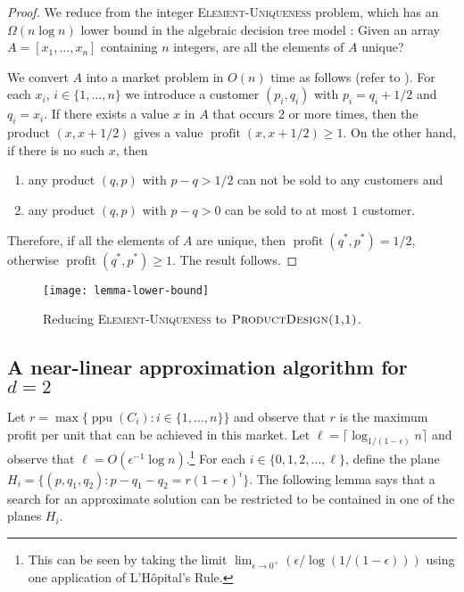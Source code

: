 \documentclass[lotsofwhite]{patmorin}
\newcommand{\ppu}{\operatorname{ppu}}
\newcommand{\val}{\operatorname{profit}}
\newcommand{\eps}{\epsilon}
\begin{document}
\begin{proof}
  We reduce from the integer \textsc{Element-Uniqueness} problem, which
  has an $\Omega(n\log n)$ lower bound in the algebraic decision tree
  model \cite{boYY,yXX}: Given an array $A=[x_1,\ldots,x_n]$ containing
  $n$ integers, are all the elements of $A$ unique?

  We convert $A$ into a market problem in $O(n)$ time as follows (refer
  to ).  For each $x_i$, $i\in\{1,\ldots,n\}$
  we introduce a customer $(p_i,q_i)$ with $p_i=q_i+1/2$ and $q_i=x_i$.
  If there exists a value $x$ in $A$ that occurs $2$ or more times, then
  the product $(x,x+1/2)$ gives a value $\val(x,x+1/2) \ge 1$.  On the
  other hand, if there is no such $x$, then \begin{enumerate} \item
  any product $(q,p)$ with $p-q>1/2$ can not be sold to any customers
  and \item any product $(q,p)$ with $p-q>0$ can be sold to at most $1$
  customer.  \end{enumerate} Therefore, if all the elements of $A$ are
  unique, then $\val(q^*,p^*) = 1/2$, otherwise $\val(q^*,p^*) \ge 1$.
  The result follows.
\end{proof}

\begin{figure}
  \begin{center}
    \texttt{[image: lemma-lower-bound]}
  \end{center}
  \caption{Reducing \textsc{Element-Uniqueness} to
           $\textsc{ProductDesign(1,1)}$.}
\end{figure}

\subsection{A near-linear approximation algorithm for $d=2$}

Let $r=\max\{\ppu(C_i) : i\in\{1,\ldots, n\}\}$ and observe that $r$
is the maximum profit per unit that can be achieved in this market.
Let $\ell = \lceil\log_{1/(1-\eps)} n\rceil$ and observe that $\ell =
O(\eps^{-1}\log n)$.\footnote{This can be seen by taking the limit
$\lim_{\eps\rightarrow 0^+} (\eps/\log(1/(1-\eps)))$ using one
application of L'H\^opital's Rule.} For each $i\in\{0,1,2,\ldots,\ell\}$,
define the plane $H_i = \{ (p,q_1,q_2) : p-q_1-q_2 = r(1-\eps)^i \}$.
The following lemma says that a search for an approximate solution can
be restricted to be contained in one of the planes $H_i$.
\end{document}
